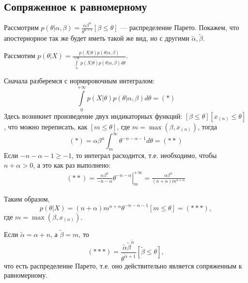 \subsection{Сопряженное к равномерному}
\begin{solution}
    Рассмотрим $p(\theta | \alpha, \beta) = \frac{\alpha \beta^{\alpha}}{\theta^{\alpha + 1}} [\beta \le \theta]$ --- распределение Парето. Покажем, что апостериорное так же будет иметь такой же вид, но с другими $\tilde{\alpha}, \tilde{\beta}$.

    Рассмотим $p(\theta | X) = \frac{p(X|\theta)p(\theta|\alpha, \beta)}{\int\limits_0^{+\infty} p(X | \theta)p(\theta | \alpha, \beta) d\theta}$.

    Сначала разберемся с нормировочным интегралом:
    \begin{equation}
        \int\limits_0^{+\infty} p(X | \theta)p(\theta | \alpha, \beta) d\theta = (*)
    \end{equation}
    Здесь возникнет произведение двух индикаторных функций: $[\beta \le \theta][x_{(n)} \le \theta]$, что можно переписать, как $[m \le \theta]$, где $m = \max(\beta, x_{(n)})$, тогда
    \begin{equation}
        (*) = \alpha \beta^{\alpha} \int_m^{\infty} \theta^{-n - \alpha - 1}d\theta = (**)
    \end{equation}
    Если $-n - \alpha - 1 \ge -1$, то интеграл расходится, т.е. необходимо, чтобы $n + \alpha > 0$, а это как раз выполнено:
    \begin{gather}
        (**) = \left.\frac{\alpha \beta^{\alpha}}{-n - \alpha} \theta^{-n -\alpha}\right|_{m}^{+\infty} = \frac{\alpha \beta^{\alpha}}{(n + \alpha)m^{n + \alpha}}
    \end{gather}

    Таким образом,
    \begin{equation}
        p(\theta | X) = (n + \alpha)m^{n + \alpha} \theta^{-n - \alpha - 1}[m \le \theta] = (***),
    \end{equation}
    где $m = \max(\beta, x_{(n)})$.

    Если $\tilde{\alpha} = \alpha + n$, а $\tilde{\beta} = m$, то
    \begin{equation}
        (***) = \frac{\tilde{\alpha}\tilde{\beta}^{\tilde{\alpha}}}{\theta^{\tilde{\alpha} + 1}}[\tilde{\beta} \le \theta],
    \end{equation}
    что есть распределение Парето, т.е. оно действительно является сопряженным к равномерному.
\end{solution}

